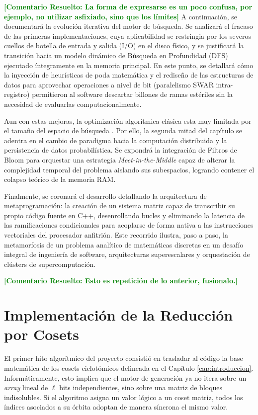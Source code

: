 \documentclass[12pt,a4paper]{tfg_domingo}
\newcommand{\ComentarioR}[1]{\textcolor{green}{\textbf{[Comentario Resuelto:
#1]}}}
\begin{document}
\ComentarioR{La forma de expresarse es un poco confusa, por ejemplo, no
utilizar asfixiado, sino que los límites}
A continuación, se documentará la evolución iterativa del motor de
búsqueda. Se analizará el fracaso de las primeras implementaciones,
cuya aplicabilidad se restringia  por los severos cuellos de botella
de entrada y salida (I/O) en el disco físico, y se justificará la
transición hacia un modelo dinámico de Búsqueda en Profundidad (DFS)
ejecutado íntegramente en la memoria principal. En este punto, se
detallará cómo la inyección de heurísticas de poda matemática y el
rediseño de las estructuras de datos para aprovechar operaciones a
nivel de bit (paralelismo SWAR intra-registro) permitieron al software
descartar billones de ramas estériles sin la necesidad de evaluarlas
computacionalmente. 


Aun con estas mejoras, la optimización algorítmica clásica esta muy
limitada por el tamaño del espacio de búsqueda . Por ello, la segunda
mitad del capítulo se adentra en el cambio de paradigma hacia la
computación distribuida y la persistencia de datos probabilística. Se
expondrá la integración de Filtros de Bloom para orquestar una
estrategia \emph{Meet-in-the-Middle} capaz de alterar la complejidad
temporal del problema aislando sus subespacios, logrando contener el
colapso teórico de la memoria RAM.  

Finalmente, se coronará el desarrollo detallando la arquitectura de
metaprogramación: la creación de un sistema matriz capaz de
transcribir su propio código fuente en C++, desenrollando bucles y
eliminando la latencia de las ramificaciones condicionales para
acoplarse de forma nativa a las instrucciones vectoriales del
procesador anfitrión. Este recorrido ilustra, paso a paso, la
metamorfosis de un problema analítico de matemáticas discretas en un
desafío integral de ingeniería de software, arquitecturas
superescalares y orquestación de clústers de supercomputación. 

\ComentarioR{Esto es repetición de lo anterior, fusionalo.}
\section{Implementación de la Reducción por Cosets}

El primer hito algorítmico del proyecto consistió en trasladar al código la base matemática de los cosets ciclotómicos delineada en el Capítulo \ref{cap:introduccion}. Informáticamente, esto implica que el motor de generación ya no itera sobre un \emph{array} lineal de $\ell$ bits independientes, sino sobre una matriz de bloques indisolubles. Si el algoritmo asigna un valor lógico a un coset matriz, todos los índices asociados a su órbita adoptan de manera síncrona el mismo valor.
\end{document}
